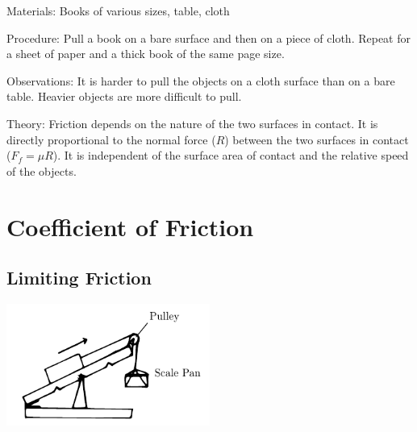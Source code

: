 \begin{multicols}{2}
\begin{description*}
\item[Materials:]{Books of various sizes, table, cloth}
\item[Procedure:]{Pull a book on a bare surface and then on a piece of cloth. Repeat for a sheet of paper and a thick book of the same page size.}
\item[Observations:]{It is harder to pull the objects on a cloth surface than on a bare table. Heavier objects are more difficult to pull.}
\item[Theory:]{Friction depends on the nature of the two surfaces in contact. It is directly proportional to the normal force ($R$) between the two surfaces in contact ($F_f=\mu R$). It is independent of the surface area of contact and the relative speed of the objects.}
\end{description*}

\columnbreak


\section*{Coefficient of Friction}


\subsection{Limiting Friction}

\begin{center}
\includegraphics[width=0.5\textwidth]{./img/limiting-friction.png}
\end{center}


\end{multicols}

